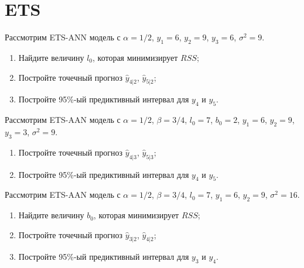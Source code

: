 \chapter{ETS}


\begin{problem}
  Рассмотрим ETS-ANN модель с $\alpha = 1/2$, $y_1=6$, $y_2=9$, $y_3 = 6$, $\sigma^2=9$. 


  \begin{enumerate}
    \item Найдите величину $l_0$, которая минимизирует $RSS$;
    \item Постройте точечный прогноз $\hat y_{4|2}$, $\hat y_{5|2}$;
     \item Постройте 95\%-ый предиктивный интервал для $y_{4}$ и $y_{5}$.
  \end{enumerate}
\begin{sol}
\end{sol}
\end{problem}

\begin{problem}
  Рассмотрим ETS-AAN модель с $\alpha = 1/2$, $\beta=3/4$, $l_{0}=7$, $b_0=2$, $y_1=6$, $y_2=9$, $y_3=3$, $\sigma^2=9$.  
  \begin{enumerate}
    \item Постройте точечный прогноз $\hat y_{4|3}$, $\hat y_{5|3}$;
    \item Постройте 95\%-ый предиктивный интервал для $y_{4}$ и $y_{5}$.
  \end{enumerate}
\begin{sol}
\end{sol}
\end{problem}

\begin{problem}
  Рассмотрим ETS-AAN модель с $\alpha = 1/2$, $\beta=3/4$, $l_{0}=7$, $y_1=6$, $y_2=9$, $\sigma^2=16$.    


  \begin{enumerate}
    \item Найдите величину $b_0$, которая минимизирует $RSS$;
    \item Постройте точечный прогноз $\hat y_{3|2}$, $\hat y_{4|2}$;
     \item Постройте 95\%-ый предиктивный интервал для $y_{3}$ и $y_{4}$.
  \end{enumerate}
\begin{sol}
\end{sol}
\end{problem}

